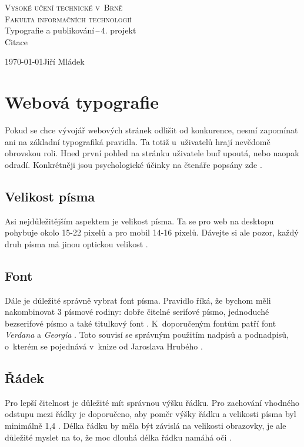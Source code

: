 \documentclass[11pt, a4paper]{article}
\begin{document}
\begin{titlepage}
    \begin{center}
        \Huge
        \textsc{Vysoké učení technické v~Brně}\\
        \huge
        \textsc{Fakulta informačních technologií}\\
        \LARGE
        Typografie a publikování\,--\,4. projekt\\
        \Huge
        Citace\\
    \end{center}
    {\Large \today \hfill Jiří Mládek}
\end{titlepage}

\section{Webová typografie}

Pokud se chce vývojář webových stránek odlišit od konkurence, nesmí zapomínat ani na základní typografiká pravidla. Ta totiž u~uživatelů hrají nevědomě obrovskou roli. Hned první pohled na stránku uživatele buď upoutá, nebo naopak odradí. Konkrétněji jsou psychologické účinky na čtenáře popsány zde \cite{Grigerova2020}.

\subsection{Velikost písma}
Asi nejdůležitějším aspektem je velikost písma. Ta se pro web na desktopu pohybuje okolo 15-22 pixelů a pro mobil 14-16 pixelů. Dávejte si ale pozor, každý druh písma má jinou optickou velikost \cite{Marcikova2020}.

\subsection{Font}
Dále je důležité správně vybrat font písma. Pravidlo říká, že bychom měli nakombinovat 3 písmové rodiny: dobře čitelné serifové písmo, jednoduché bezserifové písmo a také titulkový font \cite{Saltz2010}.  K~doporučeným fontům patří font \emph{Verdana} a \emph{Georgia} \cite{Anonymous2004}. Toto souvisí se správným použitím nadpisů a podnadpisů, o~kterém se pojednává v~knize od Jaroslava Hrubého \cite{Hruby2003}.

\subsection{Řádek}
Pro lepší čitelnost je důležité mít správnou výšku řádku. Pro zachování vhodného odstupu mezi řádky je doporučeno, aby poměr výšky řádku a velikosti písma byl minimálně 1,4 \cite{Cecetka2010}.
Délka řádku by měla být závislá na velikosti obrazovky, je ale důležité myslet na to, že moc dlouhá délka řádku namáhá oči \cite{Kupferschmidt2015}.
\end{document}
